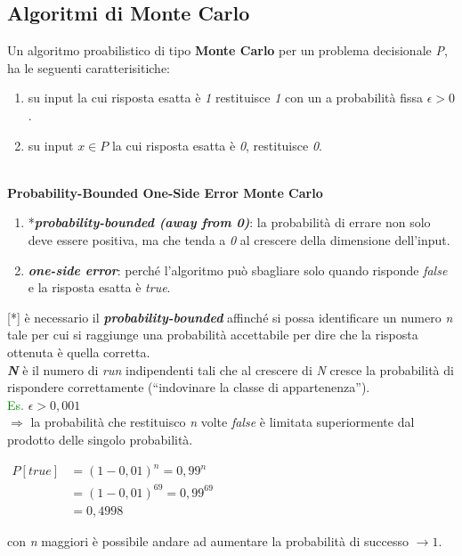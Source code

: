 \subsection{Algoritmi di Monte Carlo}
Un algoritmo proabilistico di tipo \textbf{Monte Carlo} per un problema decisionale \textit{P}, ha le seguenti caratterisitiche:
\begin{enumerate}
    \item su input la cui risposta esatta è \textit{1} restituisce \textit{1} con un a probabilità fissa $\epsilon > 0$.
    \item su input $x \in P$ la cui risposta esatta è \textit{0}, restituisce \textit{0}.
\end{enumerate}
\   \\
\textbf{Probability-Bounded One-Side Error Monte Carlo} \\
\begin{enumerate}
    \item *\textbf{\textit{probability-bounded (away from 0)}}: la probabilità di errare non solo deve essere positiva, ma che tenda a \textit{0} al crescere della dimensione dell'input.
    \item \textbf{\textit{one-side error}}: perché l'algoritmo può sbagliare solo quando risponde \textit{false} e la risposta esatta è \textit{true}.
\end{enumerate}
[*] è necessario il \textbf{\textit{probability-bounded}} affinché si possa identificare un numero \textit{n} tale per cui si raggiunge una probabilità accettabile per dire che la risposta ottenuta è quella corretta. \\
\textbf{\textit{N}} è il numero di \textit{run} indipendenti tali che al crescere di \textit{N} cresce la probabilità di rispondere correttamente (``indovinare la classe di appartenenza'').
\\ \newline
\textcolor{green}{Es.} $\epsilon > 0,001$ \\
$\Rightarrow$ la probabilità che restituisco \textit{n} volte \textit{false} è limitata superiormente dal prodotto delle singolo probabilità.
\begin{center}
    \begin{math}
        \begin{aligned}
            P[true] &= (1 - 0,01)^n = 0,99^n \\
            &= (1 - 0,01)^{69} = 0,99^{69} \\
            &= 0,4998
        \end{aligned}
    \end{math}
\end{center}
con \textit{n} maggiori è possibile andare ad aumentare la probabilità di successo $\rightarrow 1$.

